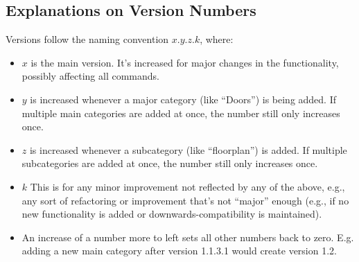 \documentclass{article}
\begin{document}
\subsection*{Explanations on Version Numbers}

Versions follow the naming convention $x.y.z.k$, where:
\begin{itemize}[nosep,parsep=2pt]
  \item $x$ is the main version. It's increased for major changes in the functionality, possibly affecting all commands.
  \item $y$ is increased whenever a major category (like ``Doors'') is being added. If multiple main categories are added at once, the number still only increases once.
  \item $z$ is increased whenever a subcategory (like ``floorplan'') is added. If multiple subcategories are added at once, the number still only increases once. 
  \item $k$ This is for any minor improvement not reflected by any of the above, e.g., any sort of refactoring or improvement that's not ``major'' enough (e.g., if no new functionality is added or downwards-compatibility is maintained). 
  \item An increase of a number more to left sets all other numbers back to zero. E.g. adding a new main category after version 1.1.3.1 would create version 1.2.
\end{itemize}
\end{document}
